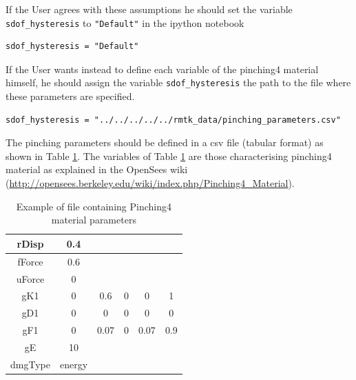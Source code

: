 If the User agrees with these assumptions he should set the variable \verb=sdof_hysteresis= to \verb="Default"= in the ipython notebook

\begin{Verbatim}[frame=single, commandchars=\\\{\}, samepage=true]
sdof_hysteresis = "Default"
\end{Verbatim}

If the User wants instead to define each variable of the pinching4 material himself, he should assign the variable \verb=sdof_hysteresis= the path to the file where these parameters are specified.

\begin{Verbatim}[frame=single, commandchars=\\\{\}, samepage=true]
sdof_hysteresis = "../../../../../rmtk_data/pinching_parameters.csv"
\end{Verbatim}

The pinching parameters should be defined in a csv file (tabular format) as shown in Table \ref{table:pinching4}. The variables of Table \ref{table:pinching4} are those characterising pinching4 material as explained in the OpenSees wiki (\href{http://opensees.berkeley.edu/wiki/index.php/Pinching4_Material}{http://opensees.berkeley.edu/wiki/index.php/Pinching4\_Material}).\\

\begin {table}[htb]
\caption{Example of file containing Pinching4 material parameters}
\label{table:pinching4}
\begin{center}
  \begin{tabular}{ | c | c | c | c | c | c |}
  \hline
	rDisp  & 0.4	&	&	&	 &	\\ \hline
	fForce	 & 0.6 &	&	&	 &	\\ \hline
	uForce	 & 0	&	&	&	 &	\\ \hline
	gK1	 & 0  &	0.6  &	0  &	0	 & 1\\ \hline
	gD1	 & 0	 & 0  &	0  &	0  &	0\\ \hline
	gF1	 & 0  &	0.07	 & 0  &	0.07  &	0.9\\ \hline
	gE	 & 10 &	&	&	 &\\ \hline
	dmgType	& energy &	&	&	 &\\ \hline
	\end{tabular}
\end{center}
\end{table}			

